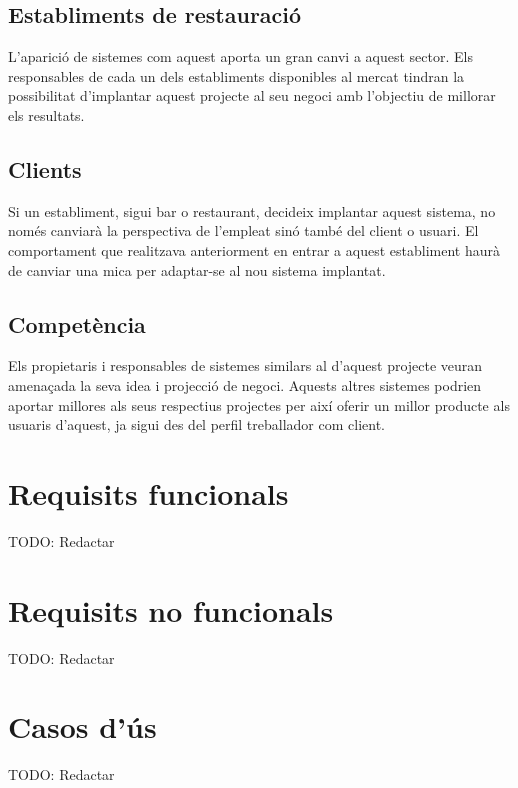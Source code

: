 \subsection{Establiments de restauració}
L’aparició de sistemes com aquest aporta un gran canvi a aquest sector. Els responsables de cada un dels establiments disponibles al mercat tindran la possibilitat d’implantar aquest projecte al seu negoci amb l’objectiu de millorar els resultats.

\subsection{Clients}
Si un establiment, sigui bar o restaurant, decideix implantar aquest sistema, no només canviarà la perspectiva de l’empleat sinó també del client o usuari. El comportament que realitzava anteriorment en entrar a aquest establiment haurà de canviar una mica per adaptar-se al nou sistema implantat.

\subsection{Competència}
Els propietaris i responsables de sistemes similars al d’aquest projecte veuran amenaçada la seva idea i projecció de negoci. Aquests altres sistemes podrien aportar millores als seus respectius projectes per així oferir un millor producte als usuaris d’aquest, ja sigui des del perfil treballador com client.



\section{Requisits funcionals}

TODO: Redactar


\section{Requisits no funcionals}

TODO: Redactar


\section{Casos d'ús}

TODO: Redactar